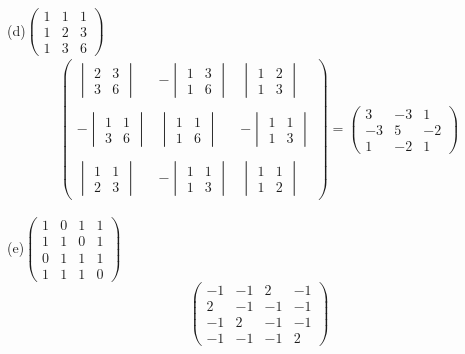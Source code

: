 \documentclass[10pt]{extarticle}
\begin{document}
\begin{itemize}
		
		
		(d)$\begin{pmatrix}
			1&1&1 \\
			1&2&3\\
			1&3&6
		\end{pmatrix}$
		\begin{gather*}
			\begin{pmatrix}
				\begin{vmatrix}
					2&3 \\
					3&6
				\end{vmatrix}
				&-\begin{vmatrix}
					1&3\\
					1&6
				\end{vmatrix}
				&\begin{vmatrix}
					1&2\\
					1&3
				\end{vmatrix}
				\\
				\\
				-\begin{vmatrix}
					1&1 \\
					3&6
				\end{vmatrix}
				&\begin{vmatrix}
					1&1 \\
					1&6
				\end{vmatrix}
				&-\begin{vmatrix}
					1&1 \\
					1&3
				\end{vmatrix}
				\\
				\\
				\begin{vmatrix}
					1&1 \\
					2&3
				\end{vmatrix}
				&-\begin{vmatrix}
					1&1 \\
					1&3
				\end{vmatrix}
				&\begin{vmatrix}
					1&1 \\
					1&2
				\end{vmatrix}
			\end{pmatrix}
			=\begin{pmatrix}
				3&-3&1 \\
				-3&5&-2\\
				1&-2&1
			\end{pmatrix}
		\end{gather*}
		
		
		(e)$\begin{pmatrix}
			1&0&1&1 \\
			1&1&0&1\\
			0&1&1&1 \\
			1&1&1&0
		\end{pmatrix}$
	\[	\begin{pmatrix}
			-1&-1&2&-1 \\
			2&-1&-1&-1\\
			-1&2&-1&-1 \\
			-1&-1&-1&2
		\end{pmatrix}\]
		

\end{itemize}
\end{document}
